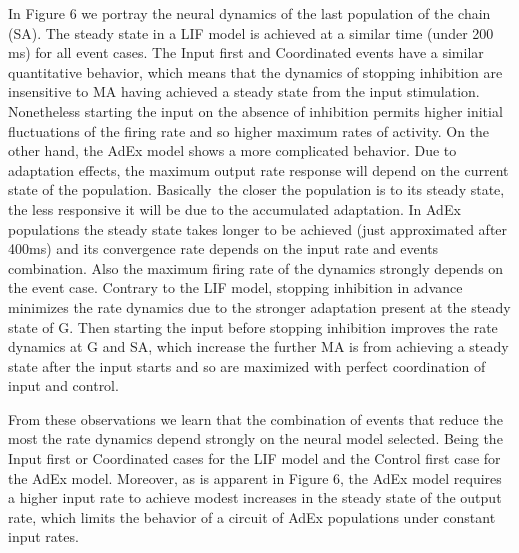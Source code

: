 \documentclass[10pt]{article}
\begin{document}
In Figure 6 we portray the neural dynamics of the last population of the chain (SA).
The steady state in a LIF model is achieved at a similar time (under 200 ms) for all event cases.
The Input first and Coordinated events have a similar quantitative behavior, which means that the dynamics of stopping inhibition are insensitive to MA having achieved a steady state from the input stimulation.
Nonetheless starting the input on the absence of inhibition permits higher initial fluctuations of the firing rate and so higher maximum rates of activity.
On the other hand, the AdEx model shows a more complicated behavior.
Due to adaptation effects, the maximum output rate response will depend on the current state of the population.
Basically~the closer the population is to its steady state, the less responsive it will be due to the accumulated adaptation.
In AdEx populations the steady state takes longer to be achieved (just approximated after 400ms) and its convergence rate depends on the input rate and events combination.
Also the maximum firing rate of the dynamics strongly depends on the event case.
Contrary to the LIF model, stopping inhibition in advance minimizes the rate dynamics due to the stronger adaptation present at the steady state of G.
Then starting the input before stopping inhibition improves the rate dynamics at G and SA, which increase the further MA is from achieving a steady state after the input starts and so are maximized with perfect coordination of input and control.

From these observations we learn that the combination of events that reduce the most the rate dynamics depend strongly on the neural model selected.
Being the Input first or Coordinated cases for the LIF model and the Control first case for the AdEx model.
Moreover, as is apparent in Figure 6, the AdEx model requires a higher input rate to achieve modest increases in the steady state of the output rate, which limits the behavior of a circuit of AdEx populations under constant input rates.
\end{document}
